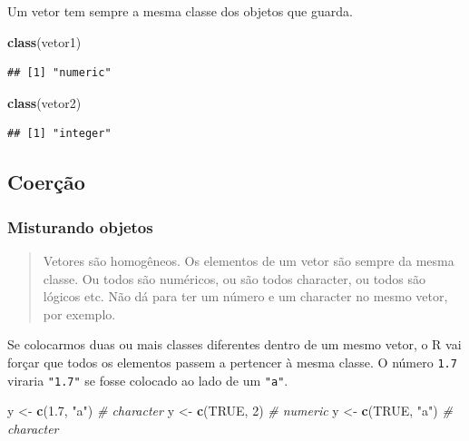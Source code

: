 \documentclass[
]{book}
\newenvironment{Shaded}{\begin{snugshade}}{\end{snugshade}}
\newcommand{\CommentTok}[1]{\textcolor[rgb]{0.56,0.35,0.01}{\textit{#1}}}
\newcommand{\DecValTok}[1]{\textcolor[rgb]{0.00,0.00,0.81}{#1}}
\newcommand{\FloatTok}[1]{\textcolor[rgb]{0.00,0.00,0.81}{#1}}
\newcommand{\KeywordTok}[1]{\textcolor[rgb]{0.13,0.29,0.53}{\textbf{#1}}}
\newcommand{\NormalTok}[1]{#1}
\newcommand{\OtherTok}[1]{\textcolor[rgb]{0.56,0.35,0.01}{#1}}
\newcommand{\StringTok}[1]{\textcolor[rgb]{0.31,0.60,0.02}{#1}}
\begin{document}
Um vetor tem sempre a mesma classe dos objetos que guarda.

\begin{Shaded}
\begin{Highlighting}[]
\KeywordTok{class}\NormalTok{(vetor1)}
\end{Highlighting}
\end{Shaded}

\begin{verbatim}
## [1] "numeric"
\end{verbatim}

\begin{Shaded}
\begin{Highlighting}[]
\KeywordTok{class}\NormalTok{(vetor2)}
\end{Highlighting}
\end{Shaded}

\begin{verbatim}
## [1] "integer"
\end{verbatim}

\hypertarget{coeruxe7uxe3o}{%
\subsection{Coerção}\label{coeruxe7uxe3o}}

\hypertarget{misturando-objetos}{%
\subsubsection{Misturando objetos}\label{misturando-objetos}}

\begin{quote}
Vetores são homogêneos. Os elementos de um vetor são sempre da mesma classe. Ou todos são numéricos, ou são todos character, ou todos são lógicos etc. Não dá para ter um número e um character no mesmo vetor, por exemplo.
\end{quote}

Se colocarmos duas ou mais classes diferentes dentro de um mesmo vetor, o R vai forçar que todos os elementos passem a pertencer à mesma classe. O número \texttt{1.7} viraria \texttt{"1.7"} se fosse colocado ao lado de um \texttt{"a"}.

\begin{Shaded}
\begin{Highlighting}[]
\NormalTok{y <{-}}\StringTok{ }\KeywordTok{c}\NormalTok{(}\FloatTok{1.7}\NormalTok{, }\StringTok{"a"}\NormalTok{)  }\CommentTok{\# character}
\NormalTok{y <{-}}\StringTok{ }\KeywordTok{c}\NormalTok{(}\OtherTok{TRUE}\NormalTok{, }\DecValTok{2}\NormalTok{)   }\CommentTok{\# numeric}
\NormalTok{y <{-}}\StringTok{ }\KeywordTok{c}\NormalTok{(}\OtherTok{TRUE}\NormalTok{, }\StringTok{"a"}\NormalTok{) }\CommentTok{\# character}
\end{Highlighting}
\end{Shaded}
\end{document}
